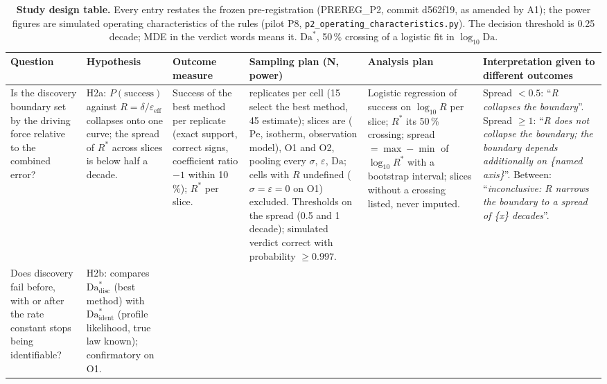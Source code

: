 \documentclass[11pt]{article}
\newcommand{\Da}{\mathrm{Da}}
\newcommand{\Pe}{\mathrm{Pe}}
\newcommand{\verdict}[1]{``\textit{#1}''}
\begin{document}
\begin{landscape}
\begin{table}
\centering
\caption{\textbf{Study design table.} Every entry restates the frozen pre-registration
(PREREG\_P2, commit d562f19, as amended by A1); the power figures are simulated operating
characteristics of the rules (pilot P8, \texttt{p2\_operating\_characteristics.py}). The
decision threshold is 0.25 decade; MDE in the verdict words means it. $\Da^{*}$, 50\,\% crossing
of a logistic fit in $\log_{10}\Da$.}
\label{tab:design}
\scriptsize
\renewcommand{\arraystretch}{1.25}
\begin{tabularx}{\linewidth}{>{\raggedright\arraybackslash}p{2.6cm}>{\raggedright\arraybackslash}p{3.3cm}>{\raggedright\arraybackslash}p{2.6cm}>{\raggedright\arraybackslash}p{3.6cm}>{\raggedright\arraybackslash}X>{\raggedright\arraybackslash}p{4.4cm}}
\toprule
Question & Hypothesis & Outcome measure & Sampling plan (N, power) & Analysis plan & Interpretation given to different outcomes\\
\midrule
Is the discovery boundary set by the driving force relative to the combined error? &
H2a: $P(\text{success})$ against $R = \delta/\varepsilon_{\mathrm{eff}}$ collapses onto one curve; the spread of $R^{*}$ across slices is below half a decade. &
Success of the best method per replicate (exact support, correct signs, coefficient ratio $-1$ within 10\,\%); $R^{*}$ per slice. &
60 replicates per cell (15 select the best method, 45 estimate); slices are ($\Pe$, isotherm, observation model), O1 and O2, pooling every $\sigma$, $\varepsilon$, $\Da$; cells with $R$ undefined ($\sigma=\varepsilon=0$ on O1) excluded. Thresholds on the spread (0.5 and 1 decade); simulated verdict correct with probability $\ge 0.997$. &
Logistic regression of success on $\log_{10}R$ per slice; $R^{*}$ its 50\,\% crossing; spread $=\max-\min$ of $\log_{10}R^{*}$ with a bootstrap interval; slices without a crossing listed, never imputed. &
Spread $<0.5$: \verdict{R collapses the boundary}. Spread $\ge 1$: \verdict{R does not collapse the boundary; the boundary depends additionally on \{named axis\}}. Between: \verdict{inconclusive: R narrows the boundary to a spread of \{x\} decades}.\\
\addlinespace
Does discovery fail before, with or after the rate constant stops being identifiable? &
H2b: compares $\Da^{*}_{\mathrm{disc}}$ (best method) with $\Da^{*}_{\mathrm{ident}}$ (profile likelihood, true law known); confirmatory on O1. &

\end{tabularx}
\end{table}
\end{landscape}
\end{document}
